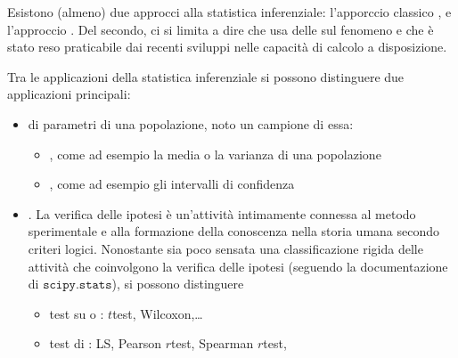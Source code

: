 \documentclass[letterpaper,10pt,italian]{jupyterBook}
\begin{document}
\sphinxAtStartPar
Esistono (almeno) due approcci alla statistica inferenziale: l’apporccio classico , e l’approccio . Del secondo, ci si limita a dire che usa delle  sul fenomeno e che è stato reso praticabile dai recenti sviluppi nelle capacità di calcolo a disposizione.  

\sphinxAtStartPar
Tra le applicazioni della statistica inferenziale si possono distinguere due applicazioni principali:

\sphinxAtStartPar
{} 
\begin{itemize}
\item {} 
\sphinxAtStartPar
{\hyperref[\detokenize{ch/statistics/estimate:statistics-hs-inference-estimate}]{}} di parametri di una popolazione, noto un campione di essa:
\begin{itemize}
\item {} 
\sphinxAtStartPar
{}, come ad esempio la media o la varianza di una popolazione

\item {} 
\sphinxAtStartPar
{}, come ad esempio gli intervalli di confidenza

\end{itemize}

\item {} 
\sphinxAtStartPar
{\hyperref[\detokenize{ch/statistics/hp-test:statistics-hs-inference-hp-test}]{}}. La verifica delle ipotesi è un’attività intimamente connessa al metodo sperimentale e alla formazione della conoscenza nella storia umana secondo criteri logici. Nonostante sia poco sensata una classificazione rigida delle attività che coinvolgono la verifica delle ipotesi (seguendo la documentazione di \(\texttt{scipy.stats}\)), si possono distinguere
\begin{itemize}
\item {} 
\sphinxAtStartPar
test su  o : \(t\)\sphinxhyphen{}test, Wilcoxon,…

\item {} 
\sphinxAtStartPar
test di : LS, Pearson \(r\)\sphinxhyphen{}test, Spearman \(r\)\sphinxhyphen{}test,


\end{itemize}
\end{itemize}
\end{document}
